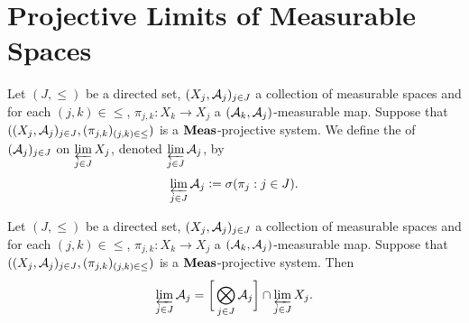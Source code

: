 \documentclass{book}
\begin{document}
\newpage
\section{Projective Limits of Measurable Spaces}

\begin{defn} 
	Let $(J, \leq)$ be a directed set, $(X_j, \mathcal{A}_j)_{j \in J}$ a collection of measurable spaces and for each $(j,k) \in \leq$, $\pi_{j,k}:X_k \rightarrow X_j$ a $(\mathcal{A}_k, \mathcal{A}_j)$-measurable map. Suppose that $((X_j, \mathcal{A}_j)_{j \in J}, (\pi_{j,k})_{(j,k) \in \leq})$ is a $\operatorname*{\text{\textbf{Meas}}}$-projective system. We define the  of $(\mathcal{A}_j)_{j \in J}$ on $\varprojlim\limits_{j \in J} X_j$, denoted $\varprojlim\limits_{j \in J} \mathcal{A}_j$, by $$\varprojlim\limits_{j \in J} \mathcal{A}_j \vcentcolon= \sigma ( \pi_j: j \in J).$$
\end{defn}

\begin{ex}  
	Let $(J, \leq)$ be a directed set, $(X_j, \mathcal{A}_j)_{j \in J}$ a collection of measurable spaces and for each $(j,k) \in \leq$, $\pi_{j,k}:X_k \rightarrow X_j$ a $(\mathcal{A}_k, \mathcal{A}_j)$-measurable map. Suppose that $((X_j, \mathcal{A}_j)_{j \in J}, (\pi_{j,k})_{(j,k) \in \leq})$ is a $\operatorname*{\text{\textbf{Meas}}}$-projective system. Then 
	$$\varprojlim\limits_{j \in J} \mathcal{A}_j = \bigg[ \bigotimes\limits_{j \in J} \mathcal{A}_j \bigg] \cap \varprojlim\limits_{j \in J} X_j.$$
\end{ex}
\end{document}
